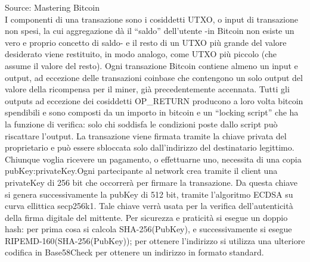 \begin{table}[ht]
	\centering
\end{table}
 

Source: Mastering Bitcoin\\

I componenti di una transazione sono i cosiddetti UTXO, o input di transazione non spesi, la cui aggregazione dà il “saldo” dell’utente -in Bitcoin non esiste un vero e proprio concetto di saldo- e il resto di un UTXO più grande del valore desiderato viene restituito, in modo analogo, come UTXO più piccolo (che assume il valore del resto). 
Ogni transazione Bitcoin contiene almeno un input e output, ad eccezione delle transazioni coinbase che contengono un solo output del valore della ricompensa per il miner, già precedentemente accennata. Tutti gli outputs ad eccezione dei cosiddetti OP\_RETURN producono a loro volta bitcoin spendibili e sono composti da un importo in bitcoin e un “locking script” che ha la funzione di verifica: solo chi soddisfa le condizioni poste dallo script può riscattare l’output. La transazione viene firmata tramite la chiave privata del proprietario e può essere sbloccata solo dall’indirizzo del destinatario legittimo.
Chiunque voglia ricevere un pagamento, o effettuarne uno, necessita di una copia pubKey:privateKey.Ogni partecipante al network crea tramite il client una privateKey di 256 bit che occorrerà per firmare la transazione.
Da questa chiave si genera successivamente la pubKey di 512 bit, tramite l’algoritmo ECDSA su curva ellittica secp256k1.
Tale chiave verrà usata per la verifica dell'autenticità della firma digitale del mittente.  
Per sicurezza e praticità si esegue un doppio hash: per prima cosa si calcola SHA-256(PubKey), e successivamente si esegue RIPEMD-160(SHA-256(PubKey)); per ottenere l'indirizzo si utilizza una ulteriore codifica in Base58Check per ottenere un indirizzo in formato standard.



